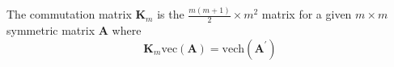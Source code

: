 The commutation matrix $\mathbf{K}_{m}$
is the $\frac{m \left( m + 1 \right)}{2} \times m^2$ matrix
for a given $m \times m$ symmetric matrix $\mathbf{A}$
where
\begin{equation}
   \mathbf{K}_{m} \mathrm{vec} \left( \mathbf{A} \right)
   =
   \mathrm{vech} \left( \mathbf{A}^{\prime} \right)
\end{equation}
